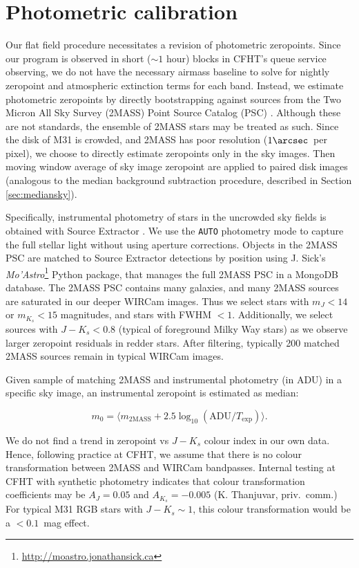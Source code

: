\documentclass[iop]{emulateapj}
\newcommand{\sw}[1]{\textit{#1}} %
\begin{document}
\section{Photometric calibration}
\label{sec:photocal}

Our flat field procedure necessitates a revision of photometric zeropoints.
Since our program is observed in short ($\sim 1$ hour) blocks in CFHT's queue service observing, we do not have the necessary airmass baseline to solve for nightly zeropoint and atmospheric extinction terms for each band.
Instead, we estimate photometric zeropoints by directly bootstrapping against sources from the Two Micron All Sky Survey (2MASS) Point Source Catalog (PSC) \citep{Skrutskie:2006}.
Although these are not standards, the ensemble of 2MASS stars may be treated as such.
Since the disk of M31 is crowded, and 2MASS has poor resolution ($1\arcsec$~per pixel), we choose to directly estimate zeropoints only in the sky images.
Then moving window average of sky image zeropoint are applied to paired disk images (analogous to the median background subtraction procedure, described in Section \ref{sec:mediansky}).

Specifically, instrumental photometry of stars in the uncrowded sky fields is obtained with Source Extractor \citep{Bertin:1996}.
We use the \texttt{AUTO} photometry mode to capture the full stellar light without using aperture corrections.
Objects in the 2MASS PSC are matched to Source Extractor detections by position using J. Sick's \sw{Mo'Astro}\footnote{\url{http://moastro.jonathansick.ca}} Python package, that manages the full 2MASS PSC in a MongoDB database.
The 2MASS PSC contains many galaxies, and many 2MASS sources are saturated in our deeper WIRCam images.
Thus we select stars with $m_J < 14$ or $m_{K_s} < 15$ magnitudes, and stars with FWHM $<1$\arcsec.
Additionally, we select sources with $J-K_s < 0.8$ (typical of foreground Milky Way stars) as we observe larger zeropoint residuals in redder stars.
After filtering, typically 200 matched 2MASS sources remain in typical WIRCam images.

Given sample of matching 2MASS and instrumental photometry (in ADU) in a specific sky image, an instrumental zeropoint is estimated as median:

\begin{equation}
  \label{eq:photcal}
  m_0 = \langle m_\mathrm{2MASS} + 2.5 \log_{10}(\mathrm{ADU}/T_\mathrm{exp}) \rangle.
\end{equation}

We do not find a trend in zeropoint vs $J-K_s$ colour index in our own data.
Hence, following practice at CFHT, we assume that there is no colour transformation between 2MASS and WIRCam bandpasses.
Internal testing at CFHT with synthetic photometry indicates that colour transformation coefficients may be $A_J = 0.05$ and $A_{K_s}=-0.005$ (K. Thanjuvar, priv.\ comm.)
For typical M31 RGB stars with $J-K_s\sim 1$, this colour transformation would be a $< 0.1$~mag effect.
\end{document}
